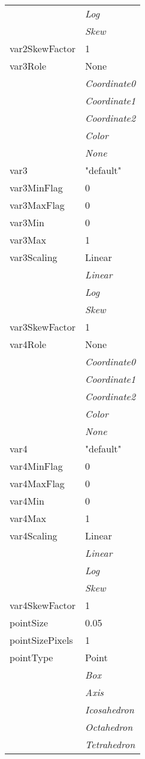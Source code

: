 \documentclass[10pt,a4paper]{report}
\begin{document}
\begin{longtable}{ll}
 & {\it  Log} \\
 & {\it  Skew} \\
var2SkewFactor  &  1 \\
var3Role  &  None   \\
 & {\it  Coordinate0} \\
 & {\it  Coordinate1} \\
 & {\it  Coordinate2} \\
 & {\it  Color} \\
 & {\it  None} \\
var3  &  "default" \\
var3MinFlag  &  0 \\
var3MaxFlag  &  0 \\
var3Min  &  0 \\
var3Max  &  1 \\
var3Scaling  &  Linear   \\
 & {\it  Linear} \\
 & {\it  Log} \\
 & {\it  Skew} \\
var3SkewFactor  &  1 \\
var4Role  &  None   \\
 & {\it  Coordinate0} \\
 & {\it  Coordinate1} \\
 & {\it  Coordinate2} \\
 & {\it  Color} \\
 & {\it  None} \\
var4  &  "default" \\
var4MinFlag  &  0 \\
var4MaxFlag  &  0 \\
var4Min  &  0 \\
var4Max  &  1 \\
var4Scaling  &  Linear   \\
 & {\it  Linear} \\
 & {\it  Log} \\
 & {\it  Skew} \\
var4SkewFactor  &  1 \\
pointSize  &  0.05 \\
pointSizePixels  &  1 \\
pointType  &  Point   \\
 & {\it  Box} \\
 & {\it  Axis} \\
 & {\it  Icosahedron} \\
 & {\it  Octahedron} \\
 & {\it  Tetrahedron} \\

\end{longtable}
\end{document}
